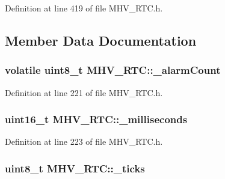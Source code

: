 Definition at line 419 of file M\-H\-V\-\_\-\-R\-T\-C.\-h.



\subsection{Member Data Documentation}
\hypertarget{class_m_h_v___r_t_c_a953a79952c9fa5fde5d1dacbc03d3b46}{
\subsubsection[{\-\_\-alarm\-Count}]{\setlength{\rightskip}{0pt plus 5cm}volatile uint8\-\_\-t M\-H\-V\-\_\-\-R\-T\-C\-::\-\_\-alarm\-Count\hspace{0.3cm}{\ttfamily [protected]}}}\label{class_m_h_v___r_t_c_a953a79952c9fa5fde5d1dacbc03d3b46}


Definition at line 221 of file M\-H\-V\-\_\-\-R\-T\-C.\-h.

\hypertarget{class_m_h_v___r_t_c_acd3e486b5e5ee1d8cf9d961c0fdbde57}{
\subsubsection[{\-\_\-milliseconds}]{\setlength{\rightskip}{0pt plus 5cm}uint16\-\_\-t M\-H\-V\-\_\-\-R\-T\-C\-::\-\_\-milliseconds\hspace{0.3cm}{\ttfamily [protected]}}}\label{class_m_h_v___r_t_c_acd3e486b5e5ee1d8cf9d961c0fdbde57}


Definition at line 223 of file M\-H\-V\-\_\-\-R\-T\-C.\-h.

\hypertarget{class_m_h_v___r_t_c_ab29c30f80f7234394299476c73f36baf}{
\subsubsection[{\-\_\-ticks}]{\setlength{\rightskip}{0pt plus 5cm}uint8\-\_\-t M\-H\-V\-\_\-\-R\-T\-C\-::\-\_\-ticks\hspace{0.3cm}{\ttfamily [protected]}}}\label{class_m_h_v___r_t_c_ab29c30f80f7234394299476c73f36baf}


